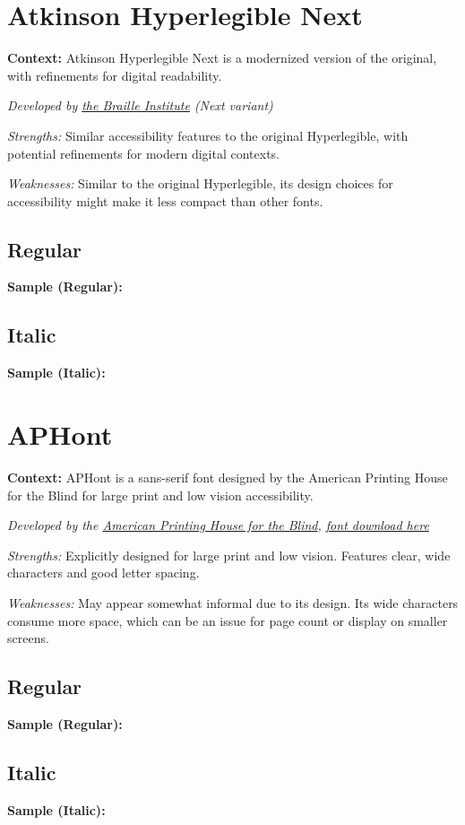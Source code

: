 \pagebreak
\section{Atkinson Hyperlegible Next}\label{app5:troubleAtkinsonNext}
\noindent
\textbf{Context:} Atkinson Hyperlegible Next is a modernized version of the original, with refinements for digital readability.

\emph{Developed by \href{https://brailleinstitute.org/freefont}{the Braille Institute} (Next variant)}
\begin{raggedright}
	\emph{Strengths:} Similar accessibility features to the original Hyperlegible, with potential refinements for modern digital contexts.

	\emph{Weaknesses:} Similar to the original Hyperlegible, its design choices for accessibility might make it less compact than other fonts.

	\subsection{Regular}
	\noindent\textbf{Sample (Regular):}
	\FontSample{\atkinsonnextfont}

	\subsection{Italic}
	\noindent\textbf{Sample (Italic):}
	\FontSample{{\atkinsonnextfont\itshape}}
\end{raggedright}


\pagebreak
\section{APHont}\label{app5:trouble7}
\noindent
\textbf{Context:} APHont is a sans-serif font designed by the American Printing House for the Blind for large print and low vision accessibility.

\emph{Developed by the \href{https://www.aph.org/resources/large-print-guidelines/}{American Printing House for the Blind}, \href{https://www.aph.org/resources/large-print-guidelines/}{font download here}}
\begin{raggedright}
	\emph{Strengths:} Explicitly designed for large print and low vision. Features clear, wide characters and good letter spacing.

	\emph{Weaknesses:} May appear somewhat informal due to its design. Its wide characters consume more space, which can be an issue for page count or display on smaller screens.

	\subsection{Regular}
	\noindent\textbf{Sample (Regular):}
	\FontSample{\aphontfont}

	\subsection{Italic}
	\noindent\textbf{Sample (Italic):}
	\FontSample{{\aphontfont\itshape}}
\end{raggedright}


